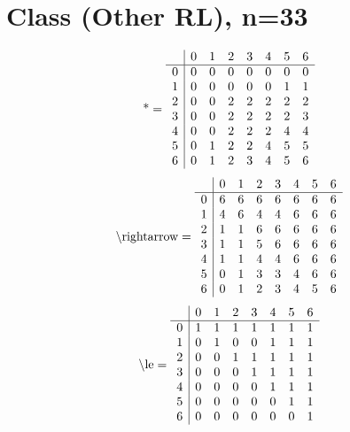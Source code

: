 \documentclass[11pt]{article}
\begin{document}
\section{Class (Other RL), n=33}
\[\text{*} = 
\begin{array}{r | r r r r r r r}
 & 0 & 1 & 2 & 3 & 4 & 5 & 6 \\ \hline
0 & 0 & 0 & 0 & 0 & 0 & 0 & 0 \\
1 & 0 & 0 & 0 & 0 & 0 & 1 & 1 \\
2 & 0 & 0 & 2 & 2 & 2 & 2 & 2 \\
3 & 0 & 0 & 2 & 2 & 2 & 2 & 3 \\
4 & 0 & 0 & 2 & 2 & 2 & 4 & 4 \\
5 & 0 & 1 & 2 & 2 & 4 & 5 & 5 \\
6 & 0 & 1 & 2 & 3 & 4 & 5 & 6 \\
\end{array}
\]
\[\text{\textbackslash rightarrow} = 
\begin{array}{r | r r r r r r r}
 & 0 & 1 & 2 & 3 & 4 & 5 & 6 \\ \hline
0 & 6 & 6 & 6 & 6 & 6 & 6 & 6 \\
1 & 4 & 6 & 4 & 4 & 6 & 6 & 6 \\
2 & 1 & 1 & 6 & 6 & 6 & 6 & 6 \\
3 & 1 & 1 & 5 & 6 & 6 & 6 & 6 \\
4 & 1 & 1 & 4 & 4 & 6 & 6 & 6 \\
5 & 0 & 1 & 3 & 3 & 4 & 6 & 6 \\
6 & 0 & 1 & 2 & 3 & 4 & 5 & 6 \\
\end{array}
\]
\[\text{\textbackslash le} = 
\begin{array}{r | r r r r r r r}
 & 0 & 1 & 2 & 3 & 4 & 5 & 6 \\ \hline
0 & 1 & 1 & 1 & 1 & 1 & 1 & 1 \\
1 & 0 & 1 & 0 & 0 & 1 & 1 & 1 \\
2 & 0 & 0 & 1 & 1 & 1 & 1 & 1 \\
3 & 0 & 0 & 0 & 1 & 1 & 1 & 1 \\
4 & 0 & 0 & 0 & 0 & 1 & 1 & 1 \\
5 & 0 & 0 & 0 & 0 & 0 & 1 & 1 \\
6 & 0 & 0 & 0 & 0 & 0 & 0 & 1 \\
\end{array}
\]
\end{document}
